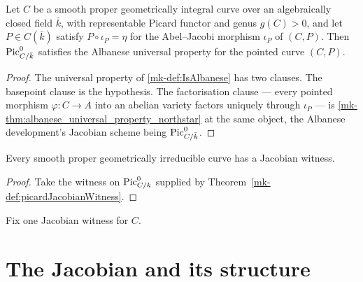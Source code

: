 \begin{lemma}
  \label{mk-lem:pic0_isAlbanese_algClosed}

  Let \(C\) be a smooth proper geometrically integral curve over an
  algebraically closed field \(\bar k\), with representable Picard functor and
  genus \(g(C) > 0\), and let \(P \in C(\bar k)\) satisfy
  \(P \circ \iota_P = \eta\) for the Abel--Jacobi morphism \(\iota_P\) of
  \((C, P)\). Then \(\operatorname{Pic}^0_{C/\bar k}\) satisfies the Albanese universal
  property for the pointed curve \((C, P)\).
\end{lemma}

\begin{proof}
  The universal property of \ref{mk-def:IsAlbanese} has two clauses. The basepoint
  clause is the hypothesis. The factorisation clause --- every pointed morphism
  \(\varphi : C \to A\) into an abelian variety factors uniquely through
  \(\iota_P\) --- is \ref{mk-thm:albanese_universal_property_northstar} at the same
  object, the Albanese development's Jacobian scheme being \(\operatorname{Pic}^0_{C/\bar k}\).
\end{proof}

\begin{theorem}
  \label{mk-thm:nonempty_jacobianWitness}

  Every smooth proper geometrically irreducible curve has a Jacobian witness.
\end{theorem}

\begin{proof}
  Take the witness on \(\operatorname{Pic}^0_{C/k}\) supplied by
  Theorem~\ref{mk-def:picardJacobianWitness}.
\end{proof}

\begin{definition}
  \label{mk-def:jacobianWitness}

  Fix one Jacobian witness for \(C\).
\end{definition}

\section{The Jacobian and its structure}

